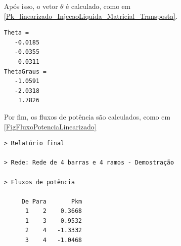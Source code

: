 Após isso, o vetor $\theta$ é calculado, como em \ref{Pk_linearizado_InjecaoLiquida_Matricial_Transposta}. 
\begin{verbatim}
Theta =
   -0.0185
   -0.0355
    0.0311
ThetaGraus =
   -1.0591
   -2.0318
    1.7826
\end{verbatim}
Por fim, os fluxos de potência são calculados, como em \ref{FigFluxoPotenciaLinearizado}
\begin{verbatim}
> Relatório final

> Rede: Rede de 4 barras e 4 ramos - Demostração

> Fluxos de potência

     De Para       Pkm 
      1    2    0.3668 
      1    3    0.9532 
      2    4   -1.3332 
      3    4   -1.0468 
\end{verbatim}





